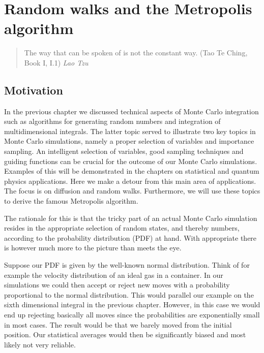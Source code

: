 


\chapter{Random walks and the Metropolis algorithm}\label{chap:mcrandom} 
\begin{quotation}
 The way that can be spoken of is not the  constant way. (Tao Te Ching, Book I, I.1) {\em Lao Tzu}
\end{quotation}

\section{Motivation}
In the previous chapter we discussed technical aspects of Monte Carlo integration
such as algorithms for generating random numbers and integration of multidimensional 
integrals.
The latter topic served to illustrate two key topics in Monte Carlo simulations,
namely a proper selection of variables and importance sampling. An intelligent selection
of variables, good sampling techniques 
and guiding functions can be crucial for the outcome of our Monte Carlo simulations.
Examples of this will be demonstrated in the chapters on statistical and quantum physics
applications. Here we make a detour from this main area of applications. The focus
is on diffusion and random walks. Furthermore, we will use these topics to derive the famous Metropolis algorithm.

The rationale for this is that the tricky part of an actual Monte Carlo simulation 
resides in the appropriate selection of random states, and thereby numbers, 
according to the probability distribution (PDF)
at hand. With appropriate there is however much more to the picture than meets the eye.

Suppose our PDF is given by the well-known normal distribution. Think of for
example the velocity distribution of an  ideal gas in a container. In our simulations we
could then  accept or reject new moves with a probability proportional to
the normal distribution. This would parallel our example on the sixth dimensional
integral in the previous chapter. However, in this case we would end up rejecting basically
all moves since the probabilities are exponentially small in most cases. The result would
be that we barely moved from the initial position. Our statistical averages would then
be significantly biased and most likely not very reliable. 

